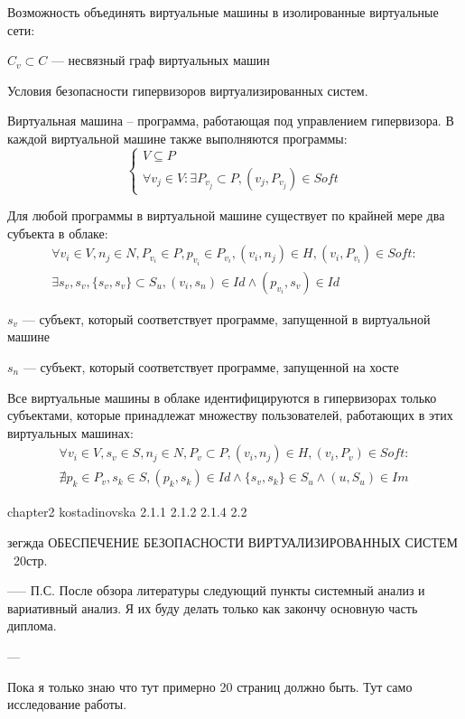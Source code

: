 Возможность объединять виртуальные машины в изолированные виртуальные сети:

$C_v \subset C$ --- несвязный граф виртуальных машин

Условия безопасности гипервизоров виртуализированных систем.

Виртуальная машина – программа, работающая под управлением гипервизора.
В каждой виртуальной машине также выполняются программы:
\begin{equation}
\left\{\begin{matrix}
V \subseteq P \\
\forall v_j \in V : \exists P_{v_j} \subset P,(v_j,P_{v_j}) \in Soft
\end{matrix}\right.
\end{equation}

Для любой программы в виртуальной машине существует по крайней мере два субъекта в облаке:
\begin{multline}
\forall v_i \in V, n_j \in N, P_{v_i} \in P, p_{v_i} \in P_{v_i}, (v_i, n_j) \in H, (v_i, P_{v_i}) \in Soft : \\
\exists s_v, s_v, \{s_v, s_v\} \subset S_u, (v_i, s_n) \in Id \wedge (p_{v_i}, s_v) \in Id
\end{multline}

$s_v$ --- субъект, который соответствует программе, запущенной в виртуальной машине

$s_n$ --- субъект, который соответствует программе, запущенной на хосте

Все виртуальные машины в облаке идентифицируются в гипервизорах только субъектами, которые принадлежат множеству пользователей, работающих в этих виртуальных машинах:
\begin{multline}
\forall v_i \in V, s_v \in S, n_j \in N, P_v \subset P, (v_i, n_j) \in H, (v_i, P_v) \in Soft : \\
\nexists p_k \in P_v, s_k \in S, (p_k, s_k) \in Id  \wedge \{s_v, s_k\} \in S_u \wedge (u, S_u) \in Im
\end{multline}
\fi

\iffalse
chapter2 kostadinovska
2.1.1
2.1.2
2.1.4
2.2

зегжда ОБЕСПЕЧЕНИЕ БЕЗОПАСНОСТИ
ВИРТУАЛИЗИРОВАННЫХ СИСТЕМ
~20стр.


-----
П.С.
После обзора литературы следующий пункты системный анализ и вариативный анализ.
Я их буду делать только как закончу основную часть диплома.

---

Пока я только знаю что тут примерно 20 страниц должно быть. Тут само исследование работы.

